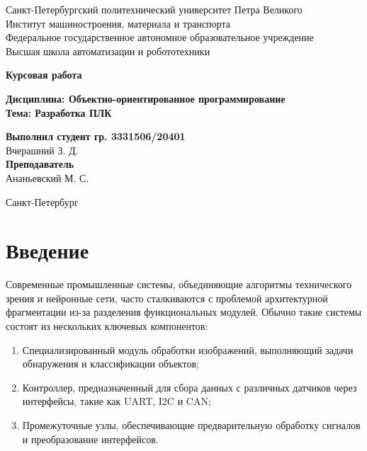 \documentclass[16pt]{article}
\begin{document}
\begin{titlepage}
    \begin{center}
        \large
        Санкт-Петербургский политехнический университет Петра Великого \\
        Институт машиностроения, материала и транспорта \\
        Федеральное государственное автономное образовательное учреждение \\
        Высшая школа автоматизации и робототехники \\

        \vspace{5cm}

        \textbf{Курсовая работа} \\
        \vspace{1cm}

        \textbf{Дисциплина: Объектно-ориентированное программирование} \\
        \textbf{Тема: Разработка ПЛК} \\

        \vspace{5cm}

        \begin{flushright}
            \large
            \textbf{Выполнил студент гр. 3331506/20401} \\
            Вчерашний З. Д. \\
            \textbf{Преподаватель} \\
            Ананьевский М. С. \\
        \end{flushright}

        \vfill

        Санкт-Петербург \\
        \the\year
    \end{center}
\end{titlepage}


\tableofcontents

\newpage
\section{Введение}
Современные промышленные системы, объединяющие алгоритмы технического зрения и нейронные сети, часто сталкиваются с проблемой архитектурной фрагментации из-за разделения функциональных модулей. Обычно такие системы состоят из нескольких ключевых компонентов:
\begin{enumerate}
    \item Специализированный модуль обработки изображений, выполняющий задачи обнаружения и классификации объектов;
    \item Контроллер, предназначенный для сбора данных с различных датчиков через интерфейсы, такие как UART, I2C и CAN;
    \item Промежуточные узлы, обеспечивающие предварительную обработку сигналов и преобразование интерфейсов.
\end{enumerate}
\end{document}

